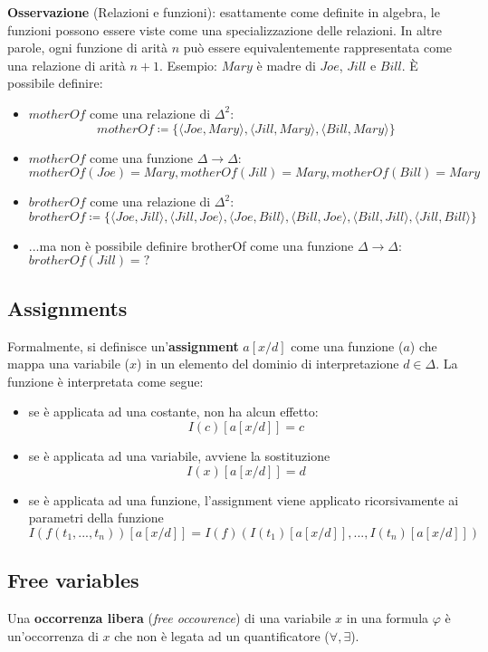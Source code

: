 \textbf{Osservazione} (Relazioni e funzioni): esattamente come definite in algebra, le funzioni possono essere viste come una specializzazione delle relazioni. In altre parole, ogni funzione di arità $n$ può essere equivalentemente rappresentata come una relazione di arità $n+1$. Esempio: $Mary$ è madre di $Joe$, $Jill$ e $Bill$. È possibile definire:
\begin{itemize}
\item $motherOf$ come una relazione di $\Delta^2$: $$motherOf \coloneqq \lbrace \langle Joe, Mary \rangle, \langle Jill, Mary \rangle, \langle Bill, Mary \rangle \rbrace$$
\item $motherOf$ come una funzione $\Delta \to \Delta$: $$motherOf(Joe) = Mary, motherOf(Jill) = Mary, motherOf(Bill) = Mary$$
\item $brotherOf$ come una relazione di $\Delta^2$: $$brotherOf \coloneqq \lbrace \langle Joe, Jill \rangle, \langle Jill, Joe \rangle, \langle Joe, Bill \rangle , \langle Bill, Joe \rangle, \langle Bill, Jill \rangle, \langle Jill, Bill \rangle \rbrace$$
\item ...ma non è possibile definire brotherOf come una funzione $\Delta \to \Delta$: $brotherOf(Jill) = ?$
\end{itemize}

\subsection{Assignments}
Formalmente, si definisce un'\textbf{assignment} $a[x/d]$ come una funzione ($a$) che mappa una variabile ($x$) in un elemento del dominio di interpretazione $d \in \Delta$. La funzione è interpretata come segue:
\begin{itemize}
\item se è applicata ad una costante, non ha alcun effetto: $$I(c)[a[x/d]] = c$$
\item se è applicata ad una variabile, avviene la sostituzione $$I(x)[a[x/d]] = d$$
\item se è applicata ad una funzione, l'assignment viene applicato ricorsivamente ai parametri della funzione $$I(f(t_1, ..., t_n))[a[x/d]] = I(f)(I(t_1)[a[x/d]], ..., I(t_n)[a[x/d]])$$
\end{itemize}

\subsection{Free variables}
Una \textbf{occorrenza libera} (\textit{free occourence}) di una variabile $x$ in una formula $\varphi$ è un'occorrenza di $x$ che non è legata ad un quantificatore ($\forall, \exists$).
\\

